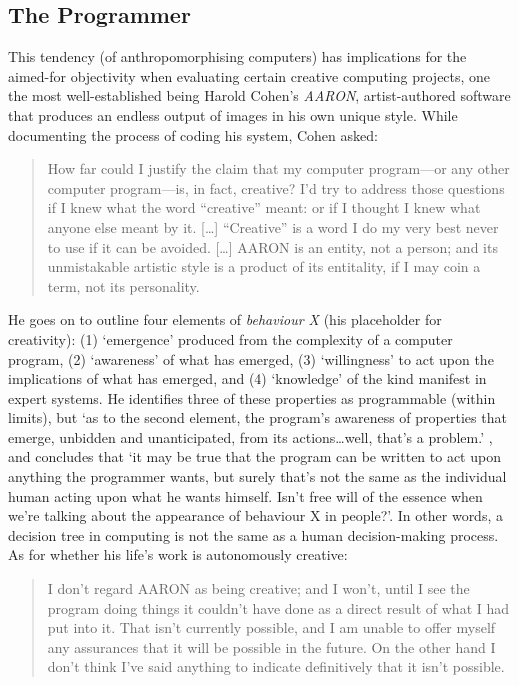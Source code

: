 \subsection{The Programmer}

This tendency (of anthropomorphising computers) has implications for the aimed-for objectivity when evaluating certain creative computing projects, one the most well-established being Harold Cohen's \emph{AARON}, artist-authored software that produces an endless output of images in his own unique style. While documenting the process of coding his system, Cohen asked:

\begin{quotation}
  How far could I justify the claim that my computer program---or any other computer program---is, in fact, creative? I'd try to address those questions if I knew what the word ``creative'' meant: or if I thought I knew what anyone else meant by it. [\ldots] ``Creative'' is a word I do my very best never to use if it can be avoided. [\ldots] AARON is an entity, not a person; and its unmistakable artistic style is a product of its entitality, if I may coin a term, not its personality. 
\end{quotation}

He goes on to outline four elements of \emph{behaviour X} (his placeholder for creativity): (1) `emergence' produced from the complexity of a computer program, (2) `awareness' of what has emerged, (3) `willingness' to act upon the implications of what has emerged, and (4) `knowledge' of the kind manifest in expert systems. He identifies three of these properties as programmable (within limits), but `as to the second element, the program\rq s awareness of properties that emerge, unbidden and unanticipated, from its actions\ldots  well, that\rq s a problem.' \autocite{Cohen1999}, and concludes that `it may be true that the program can be written to act upon anything the programmer wants, but surely that\rq s not the same as the individual human acting upon what he wants himself. Isn\rq t free will of the essence when we\rq re talking about the appearance of behaviour X in people?'. In other words, a decision tree in computing is not the same as a human decision-making process. As for whether his life's work is autonomously creative:

\begin{quotation}
  I don't regard AARON as being creative; and I won't, until I see the program doing things it couldn't have done as a direct result of what I had put into it. That isn't currently possible, and I am unable to offer myself any assurances that it will be possible in the future. On the other hand I don't think I've said anything to indicate definitively that it isn't possible. 
\end{quotation}

